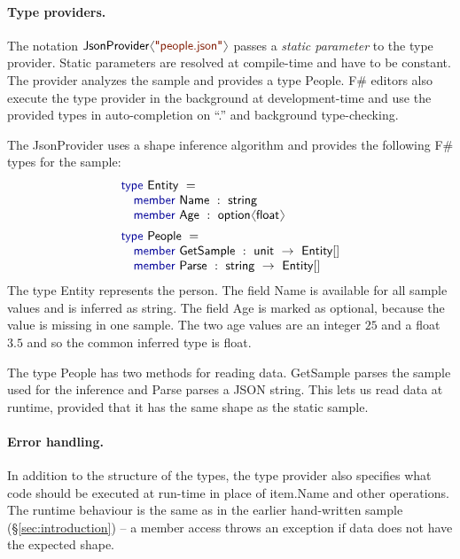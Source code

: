 \documentclass[10pt,preprint,blind,clearpagebib]{sigplanconf}
\newcommand{\langl}{\begin{picture}(4.5,7)
\put(1.1,2.5){\rotatebox{60}{\line(1,0){5.5}}}
\put(1.1,2.5){\rotatebox{300}{\line(1,0){5.5}}}
\end{picture}}
\newcommand{\rangl}{\begin{picture}(4.5,7)
\put(.9,2.5){\rotatebox{120}{\line(1,0){5.5}}}
\put(.9,2.5){\rotatebox{240}{\line(1,0){5.5}}}
\end{picture}}
\newcommand{\kvd}[1]{\textnormal{\textcolor{kvdclr}{\sffamily #1}}}
\newcommand{\str}[1]{\textnormal{\textcolor{strclr}{\sffamily "#1"}}}
\newcommand{\ident}[1]{\textnormal{\sffamily #1}}
\begin{document}
\paragraph{Type providers.}
The notation $\ident{JsonProvider}\langl\str{people.json}\rangl$ passes a \emph{static parameter} 
to the type provider. Static parameters are resolved at compile-time and have to be constant. 
The provider analyzes the sample and provides a type  \ident{People}. F\# editors also 
execute the type provider in the background at development-time and use the provided types 
in auto-completion on ``.'' and background type-checking.

The \ident{JsonProvider} uses a shape inference algorithm and provides
the following F\# types for the sample:
%
\begin{equation*}
\begin{array}{l}
 \kvd{type}~\ident{Entity}~=  \\
 \quad \kvd{member}~\ident{Name}~:~\ident{string} \\
 \quad \kvd{member}~\ident{Age}~:~\ident{option}\langl \ident{float}\rangl \\[0.5em]
 \kvd{type}~\ident{People}~=  \\
 \quad \kvd{member}~\ident{GetSample}~:~\ident{unit}~\rightarrow~\ident{Entity}[] \\
 \quad \kvd{member}~\ident{Parse}~:~\ident{string}~\rightarrow~\ident{Entity}[] \\
\end{array}
\end{equation*}
%
The type \ident{Entity} represents the person. The field \ident{Name} is available for all
sample values and is inferred as \ident{string}. The field \ident{Age} is marked as optional,
because the value is missing in one sample. The two age values are an integer $25$ and a 
float $3.5$ and so the common inferred type is \ident{float}.

The type \ident{People} has two methods for reading data. \ident{GetSample} parses the
sample used for the inference and \ident{Parse} parses a JSON string. This lets us read
data at runtime, provided that it has the same shape as the static sample.

\paragraph{Error handling.}
In addition to the structure of the types, the type provider also specifies what code should be 
executed at run-time in place of \ident{item.Name} and other operations. The runtime behaviour is 
the same as in the earlier hand-written sample (\S\ref{sec:introduction}) -- a member access 
throws an exception if data does not have the expected shape.
\end{document}
